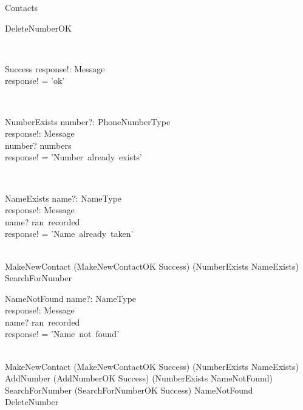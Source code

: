 \begin{class}{Contacts}
\begin{op}{DeleteNumberOK}
\ST
\end{op}\\
\begin{op}{Success}
response!: Message \\
\ST
response! = 'ok'
\end{op}\\
\begin{op}{NumberExists}
number?: PhoneNumberType \\
response!: Message \\
\ST
number? \in numbers \\
response! = 'Number~already~exists'
\end{op}\\
\zbreak
\begin{op}{NameExists}
name?: NameType \\
response!: Message \\
\ST
name? \in ran~recorded \\
response! = 'Name~already~taken'
\end{op}\\
\also
MakeNewContact \sdef (MakeNewContactOK \wedge Success) \oplus (NumberExists \lor NameExists) \\
SearchForNumber \sdef \\
\begin{op}{NameNotFound}
    name?: NameType \\
    response!: Message \\
    \ST
    name? \notin ran~recorded \\
    response! = 'Name~not~found'
\end{op}\\
\also
MakeNewContact \sdef (MakeNewContactOK \wedge Success) \oplus (NumberExists \lor NameExists) \\
AddNumber \sdef (AddNumberOK \wedge Success) \oplus (NumberExists \lor NameNotFound) \\
SearchForNumber \sdef (SearchForNumberOK \wedge Success) \oplus NameNotFound \\
DeleteNumber \sdef
\end{class}
